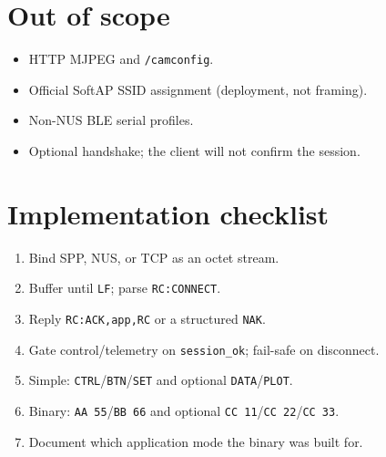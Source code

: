 \documentclass[12pt,a4paper]{article}
\begin{document}
\section{Out of scope}

\begin{itemize}[leftmargin=1.2cm]
  \item HTTP MJPEG and \texttt{/camconfig}.
  \item Official SoftAP SSID assignment (deployment, not framing).
  \item Non-NUS BLE serial profiles.
  \item Optional handshake; the client will not confirm the session.
\end{itemize}

\section{Implementation checklist}

\begin{enumerate}[leftmargin=1.6cm]
  \item Bind SPP, NUS, or TCP as an octet stream.
  \item Buffer until \texttt{LF}; parse \texttt{RC:CONNECT}.
  \item Reply \texttt{RC:ACK,app,RC} or a structured \texttt{NAK}.
  \item Gate control/telemetry on \texttt{session\_ok}; fail-safe on disconnect.
  \item Simple: \texttt{CTRL}/\texttt{BTN}/\texttt{SET} and optional
        \texttt{DATA}/\texttt{PLOT}.
  \item Binary: \texttt{AA 55}/\texttt{BB 66} and optional
        \texttt{CC 11}/\texttt{CC 22}/\texttt{CC 33}.
  \item Document which application mode the binary was built for.
\end{enumerate}
\end{document}
